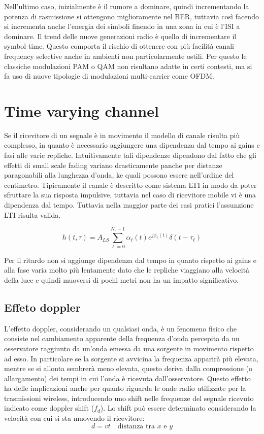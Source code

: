 Nell'ultimo caso, inizialmente è il rumore a dominare, quindi incrementando la potenza di rasmissione si ottengono miglioramente nel BER, tuttavia così facendo si incrementa anche l'energia dei simboli finendo in una zona in cui è l'ISI a dominare.
Il trend delle nuove generazioni radio è quello di incrementare il symbol-time. Questo comporta il rischio di ottenere con più facilità canali frequency selective anche in ambienti non particolarmente ostili. Per questo le classiche modulazioni PAM o QAM non risultano adatte in certi contesti, ma si fa uso di nuove tipologie di modulazioni multi-carrier come OFDM.





\section*{Time varying channel}
Se il ricevitore di un segnale è in movimento il modello di canale risulta più complesso, in quanto è necessario aggiungere una dipendenza dal tempo ai gains e fasi alle varie repliche. Intuitivamente tali dipendenze dipendono dal fatto che gli effetti di small scale fading variano drasticamente panche per distanze paragonabili alla lunghezza d'onda, ke quali possono essere nell'ordine del centimetro. Tipicamente il canale è descritto come sistema LTI in modo da poter sfruttare la sua risposta impulsive, tuttavia nel caso di ricevitore mobile vi è una dipendenza dal tempo. Tuttavia nella maggior parte dei casi pratici l'assunzione LTI risulta valida. 

\[
    h(t, \tau) = A_{LS} \sum_{\ell=0}^{N_c-1} \alpha_{\ell}(t) e^{j\phi_{\ell}(t)} \delta(t - \tau_{\ell})
\]


Per il ritardo non si aggiunge dipendenza dal tempo in quanto rispetto ai gains e alla fase varia molto più lentamente dato che le repliche viaggiano alla velocità della luce e quindi muoversi di pochi metri non ha un impatto significativo.

\subsection*{Effeto doppler}
L'effetto doppler, considerando un qualsiasi onda, è un fenomeno fisico che consiste nel cambiamento apparente della frequenza d'onda percepita da un osservatore raggiunto da un'onda emessa da una sorgente in movimento rispetto ad esso. In particolare se la sorgente si avvicina la frequenza apparirà più elevata, mentre se si allonta sembrerà meno elevata, questo deriva dalla compressione (o allargamento) dei tempi in cui l'onda è ricevuta dall'osservatore. Questo effetto ha delle implicazioni anche per quanto riguarda le onde radio utilizzate per la trasmissioni wireless, introducendo uno shift nelle frequenze del segnale ricevuto indicato come doppler shift ($f_d$). Lo shift può essere determinato considerando la velocità con cui si sta muovendo il ricevitore:
\[
    d = vt \quad \text{distanza tra $x$ e $y$}
\]  

